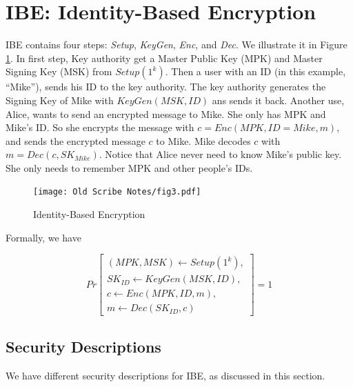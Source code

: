 \documentclass[12pt]{tufte-book}
\begin{document}
\section{IBE: Identity-Based Encryption}
IBE contains four steps: \emph{Setup}, \emph{KeyGen}, \emph{Enc}, and \emph{Dec}. We illustrate it in Figure \ref{fig:ibe}.
In first step, Key authority get a Master Public Key (MPK) and Master Signing Key (MSK) from $Setup(1^k)$. Then a user with an ID
 (in this example, ``Mike''), sends his ID to the key authority. The key authority generates the Signing Key of Mike with $KeyGen(MSK, ID)$ ans sends it back. Another use, Alice, wants to send an encrypted message to Mike. She only has MPK and Mike's ID. So she encrypts the message with $c=Enc(MPK, ID=Mike, m)$, and sends the encrypted message $c$ to Mike. Mike decodes $c$ with $m=Dec(c, SK_{Mike})$. Notice that Alice never need to know Mike's public key. She only needs to remember MPK and other people's IDs.

\begin{figure}
\label{fig:ibe}
\centering
  \texttt{[image: Old Scribe Notes/fig3.pdf]}
\caption{Identity-Based Encryption}
\end{figure}

Formally, we have

$$Pr\begin{bmatrix}
       (MPK, MSK) \gets Setup(1^k), \\[0.3em]
       SK_{ID} \gets KeyGen(MSK, ID), \\[0.3em]
       c \gets Enc(MPK, ID, m), \\[0.3em]
       m \gets Dec(SK_{ID}, c)
     \end{bmatrix}
      =1$$

\subsection{Security Descriptions}

We have different security descriptions for IBE, as discussed in this section.
\end{document}
